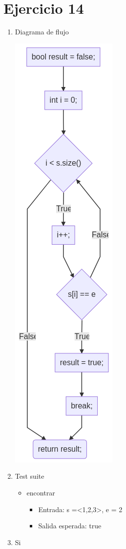 \documentclass{article}
\begin{document}
\section*{Ejercicio 14}

\begin{enumerate}
    \item Diagrama de flujo
    
    \includegraphics[scale=0.65]{recursos/existeElemento.png}

    \item Test suite
        \begin{itemize}
            \item encontrar
                \begin{itemize}
                    \item Entrada: s =<1,2,3>, e = 2
                    \item Salida esperada: true
                \end{itemize}
        \end{itemize}
    \item Si
\end{enumerate}
\end{document}
